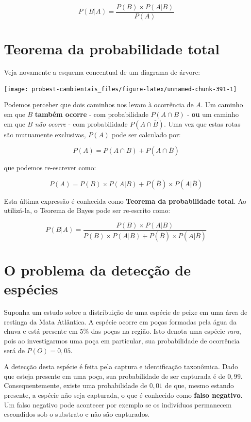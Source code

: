 \documentclass[
]{book}
\begin{document}
\[P(B|A) = \frac{P(B) \times P(A|B)}{P(A)}\]

\hypertarget{teorema-da-probabilidade-total}{%
\section{Teorema da probabilidade total}\label{teorema-da-probabilidade-total}}

Veja novamente a esquema concentual de um diagrama de árvore:

\begin{center}\texttt{[image: probest-cambientais\_files/figure-latex/unnamed-chunk-391-1]} \end{center}

Podemos perceber que dois caminhos nos levam à ocorrência de \(A\). Um caminho em que \(B\) \textbf{também ocorre} - com probabilidade \(P(A \cap B)\) - \textbf{ou} um caminho em que \(B\) \emph{não ocorre} - com probabilidade \(P(A \cap \overline{B})\). Uma vez que estas rotas são mutuamente exclusivas, \(P(A)\) pode ser calculado por:

\[P(A) = P(A \cap B) + P(A \cap \overline{B})\]

que podemos re-escrever como:

\[P(A) = P(B) \times P(A|B) + P(\overline{B}) \times P(A|\overline{B})\]

Esta última expressão é conhecida como \textbf{Teorema da probabilidade total}. Ao utilizá-la, o Teorema de Bayes pode ser re-escrito como:

\[P(B|A) = \frac{P(B) \times P(A|B)}{P(B) \times P(A|B) + P(\overline{B}) \times P(A|\overline{B})}\]

\hypertarget{o-problema-da-detecuxe7uxe3o-de-espuxe9cies}{%
\section{O problema da detecção de espécies}\label{o-problema-da-detecuxe7uxe3o-de-espuxe9cies}}

Suponha um estudo sobre a distribuição de uma espécie de peixe em uma área de restinga da Mata Atlântica. A espécie ocorre em poças formadas pela água da chuva e está presente em 5\% das poças na região. Isto denota uma espécie \emph{rara}, pois ao investigarmos uma poça em particular, sua probabilidade de ocorrência será de \(P(O) = 0,05\).

A detecção desta espécie é feita pela captura e identificação taxonômica. Dado que esteja presente em uma poça, sua probabilidade de ser capturada é de \(0,99\). Consequentemente, existe uma probabilidade de \(0,01\) de que, mesmo estando presente, a espécie não seja capturada, o que é conhecido como \textbf{falso negativo}. Um falso negativo pode acontecer por exemplo se os indivíduos permanecem escondidos sob o substrato e não são capturados.
\end{document}
